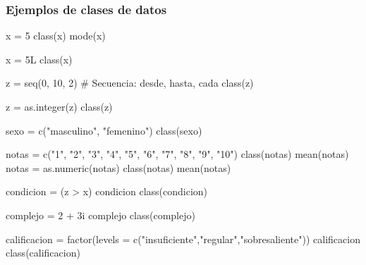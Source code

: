 \documentclass[
  spanish,
  letterpaper,
  DIV=11,
  numbers=noendperiod]{scrreprt}
\newenvironment{Shaded}{\begin{snugshade}}{\end{snugshade}}
\newcommand{\AttributeTok}[1]{\textcolor[rgb]{0.40,0.45,0.13}{#1}}
\newcommand{\CommentTok}[1]{\textcolor[rgb]{0.37,0.37,0.37}{#1}}
\newcommand{\DecValTok}[1]{\textcolor[rgb]{0.68,0.00,0.00}{#1}}
\newcommand{\FunctionTok}[1]{\textcolor[rgb]{0.28,0.35,0.67}{#1}}
\newcommand{\NormalTok}[1]{\textcolor[rgb]{0.00,0.23,0.31}{#1}}
\newcommand{\OtherTok}[1]{\textcolor[rgb]{0.00,0.23,0.31}{#1}}
\newcommand{\SpecialCharTok}[1]{\textcolor[rgb]{0.37,0.37,0.37}{#1}}
\newcommand{\StringTok}[1]{\textcolor[rgb]{0.13,0.47,0.30}{#1}}
\begin{document}
\subsubsection{Ejemplos de clases de
datos}\label{ejemplos-de-clases-de-datos}

\begin{Shaded}
\begin{Highlighting}[]

\NormalTok{x }\OtherTok{=} \DecValTok{5}
\FunctionTok{class}\NormalTok{(x)}
\FunctionTok{mode}\NormalTok{(x)}

\NormalTok{x }\OtherTok{=} \DecValTok{5}\NormalTok{L}
\FunctionTok{class}\NormalTok{(x)}

\NormalTok{z }\OtherTok{=} \FunctionTok{seq}\NormalTok{(}\DecValTok{0}\NormalTok{, }\DecValTok{10}\NormalTok{, }\DecValTok{2}\NormalTok{) }\CommentTok{\# Secuencia: \textquotesingle{}desde\textquotesingle{}, \textquotesingle{}hasta\textquotesingle{}, \textquotesingle{}cada\textquotesingle{}}
\FunctionTok{class}\NormalTok{(z)}

\NormalTok{z }\OtherTok{=} \FunctionTok{as.integer}\NormalTok{(z)}
\FunctionTok{class}\NormalTok{(z)}

\NormalTok{sexo }\OtherTok{=} \FunctionTok{c}\NormalTok{(}\StringTok{"masculino"}\NormalTok{, }\StringTok{"femenino"}\NormalTok{)}
\FunctionTok{class}\NormalTok{(sexo)}

\NormalTok{notas }\OtherTok{=} \FunctionTok{c}\NormalTok{(}\StringTok{"1"}\NormalTok{, }\StringTok{"2"}\NormalTok{, }\StringTok{"3"}\NormalTok{, }\StringTok{"4"}\NormalTok{, }\StringTok{"5"}\NormalTok{, }\StringTok{"6"}\NormalTok{, }\StringTok{"7"}\NormalTok{, }\StringTok{"8"}\NormalTok{, }\StringTok{"9"}\NormalTok{, }\StringTok{"10"}\NormalTok{)}
\FunctionTok{class}\NormalTok{(notas)}
\FunctionTok{mean}\NormalTok{(notas)}
\NormalTok{notas }\OtherTok{=} \FunctionTok{as.numeric}\NormalTok{(notas)}
\FunctionTok{class}\NormalTok{(notas)}
\FunctionTok{mean}\NormalTok{(notas)}

\NormalTok{condicion }\OtherTok{=}\NormalTok{ (z }\SpecialCharTok{\textgreater{}}\NormalTok{ x)}
\NormalTok{condicion}
\FunctionTok{class}\NormalTok{(condicion)}

\NormalTok{complejo }\OtherTok{=} \DecValTok{2} \SpecialCharTok{+} \DecValTok{3}\NormalTok{i}
\NormalTok{complejo}
\FunctionTok{class}\NormalTok{(complejo)}

\NormalTok{calificacion }\OtherTok{=} \FunctionTok{factor}\NormalTok{(}\AttributeTok{levels =} \FunctionTok{c}\NormalTok{(}\StringTok{"insuficiente"}\NormalTok{,}\StringTok{"regular"}\NormalTok{,}\StringTok{"sobresaliente"}\NormalTok{))}
\NormalTok{calificacion}
\FunctionTok{class}\NormalTok{(calificacion)}


\end{Highlighting}
\end{Shaded}
\end{document}

